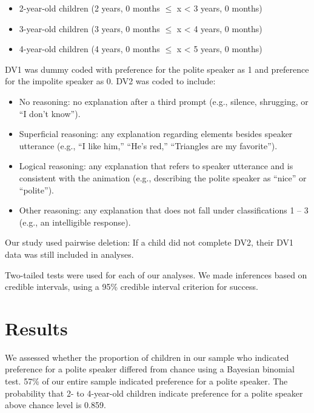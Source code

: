 \documentclass[
  english,
  man,floatsintext]{apa6}
\begin{document}
\begin{itemize}
\item
  2-year-old children (2 years, 0 months \(\leqslant\) x \textless{} 3 years, 0 months)
\item
  3-year-old children (3 years, 0 months \(\leqslant\) x \textless{} 4 years, 0 months)
\item
  4-year-old children (4 years, 0 months \(\leqslant\) x \textless{} 5 years, 0 months)
\end{itemize}

DV1 was dummy coded with preference for the polite speaker as 1 and preference for the impolite speaker as 0. DV2 was coded to include:

\begin{itemize}
\item
  No reasoning: no explanation after a third prompt (e.g., silence, shrugging, or ``I don't know'').
\item
  Superficial reasoning: any explanation regarding elements besides speaker utterance (e.g., ``I like him,'' ``He's red,'' ``Triangles are my favorite'').
\item
  Logical reasoning: any explanation that refers to speaker utterance and is consistent with the animation (e.g., describing the polite speaker as ``nice'' or ``polite'').
\item
  Other reasoning: any explanation that does not fall under classifications 1 -- 3 (e.g., an intelligible response).
\end{itemize}

Our study used pairwise deletion: If a child did not complete DV2, their DV1 data was still included in analyses.

Two-tailed tests were used for each of our analyses. We made inferences based on credible intervals, using a 95\% credible interval criterion for success.

\hypertarget{results}{%
\section{Results}\label{results}}

We assessed whether the proportion of children in our sample who indicated preference for a polite speaker differed from chance using a Bayesian binomial test. 57\% of our entire sample indicated preference for a polite speaker. The probability that 2- to 4-year-old children indicate preference for a polite speaker above chance level is 0.859.
\end{document}
